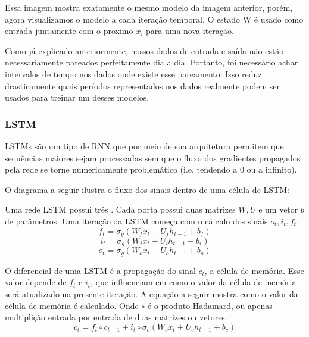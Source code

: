 % 


Essa imagem mostra exatamente o mesmo modelo da imagem anterior, porém, agora visualizamos o modelo a cada iteração temporal. O estado W é usado como entrada juntamente com o proximo $x_i$ para uma nova iteração.

\bigskip

Como já explicado anteriormente, nossos dados de entrada e saída não estão necessariamente pareados perfeitamente dia a dia. Portanto, foi necessário achar intervalos de tempo nos dados onde existe esse pareamento. Isso reduz drasticamente quais períodos representados nos dados realmente podem ser usados para treinar um desses modelos.


\subsubsection{LSTM}

LSTMs \citep{lstm} são um tipo de RNN que por meio de sua arquitetura permitem que sequências
maiores sejam processadas sem que o fluxo dos gradientes propagados pela rede se torne
numericamente problemático (i.e. tendendo a 0 ou a infinito).

O diagrama a seguir ilustra o fluxo dos sinais dentro de uma célula de LSTM: \\

\begin{center}

\end{center}


Uma rede LSTM possui três . Cada porta possui duas matrizes $W,U$ e um
vetor $b$ de parâmetros. Uma iteração da LSTM começa com o cálculo dos sinais
$o_t,i_t,f_t$.\\

\[f_t = \sigma_g(W_fx_t + U_fh_{t-1} + b_f)\]
\[i_t = \sigma_g(W_ix_t + U_ih_{t-1} + b_i)\]
\[o_t = \sigma_g(W_ox_t + U_oh_{t-1} + b_o)\]

O diferencial de uma LSTM é a propagação do sinal $c_t$, a célula de memória.
Esse valor depende de $f_t$ e $i_t$, que influenciam em como o valor da
célula de memória será atualizado na presente iteração. A equação a seguir
mostra como o valor da célula de memória é calculado. Onde $\circ$ é o produto Hadamard, ou apenas multiplição entrada por entrada de
duas matrizes ou vetores. \\

\[c_t = f_t \circ c_{t-1} + i_t \circ \sigma_c(W_cx_t + U_ch_{t-1} + b_c)\]

